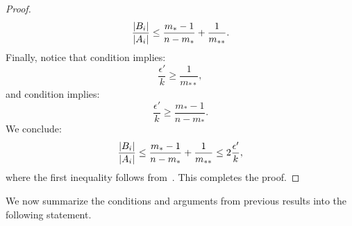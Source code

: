 \begin{remark}
\begin{proof}
\begin{equation}
                    \frac{| B_i |}{| A_i |} \leq \frac{m_* - 1}{n - m_*} + \frac{1}{m_{**}}.
                \end{equation}
                Finally, notice that condition  implies:
                \[
                    \frac{\epsilon'}{k} \geq \frac{1}{m_{**}},
                \]
                and condition  implies:
                \[
                    \frac{\epsilon'}{k} \geq \frac{m_* - 1}{n - m_*}.
                \]
                We conclude:
                \[
                    \frac{| B_i |}{| A_i |} \leq \frac{m_* - 1}{n - m_*} + \frac{1}{m_{**}} \leq 2 \frac{\epsilon'}{k},
                \]
                where the first inequality follows from~.
                This completes the proof.
            \end{proof}
        \end{remark}

        We now summarize the conditions and arguments from previous results into the following statement.


